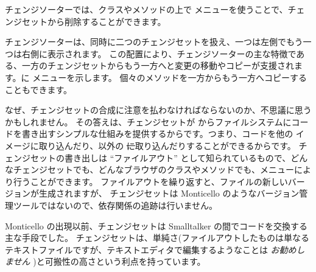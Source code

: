 \documentclass[a4paper,10pt,twoside]{book}
\begin{document}
チェンジソーターでは、クラスやメソッドの上で \actclick メニューを使うことで、チェンジセットから削除することができます。

チェンジソーターは、同時に二つのチェンジセットを扱え、一つは左側でもう一つは右側に表示されます。
この配置により、チェンジソーターの主な特徴である、一方のチェンジセットからもう一方へと変更の移動やコピーが支援されます。に \actclick メニューを示します。
個々のメソッドを一方からもう一方へコピーすることもできます。

なぜ、チェンジセットの合成に注意を払わなければならないのか、不思議に思うかもしれません。
その答えは、チェンジセットが \pharo からファイルシステムにコードを書き出すシンプルな仕組みを提供するからです。つまり、コードを他の \pharo イメージに取り込んだり、\pharo 以外の \st に取り込んだりすることができるからです。
チェンジセットの書き出しは ``ファイルアウト'' として知られているもので、どんなチェンジセットでも、どんなブラウザのクラスやメソッドでも、\actclick メニューにより行うことができます。
ファイルアウトを繰り返すと、ファイルの新しいバージョンが生成されますが、
チェンジセットは Monticello のようなバージョン管理ツールではないので、依存関係の追跡は行いません。

Monticello の出現以前、チェンジセットは Smalltalker の間でコードを交換する主な手段でした。
チェンジセットは、単純さ(ファイルアウトしたものは単なるテキストファイルですが、テキストエディタで編集するようなことは \emph{お勧めしません} )と可搬性の高さという利点を持っています。
\end{document}

